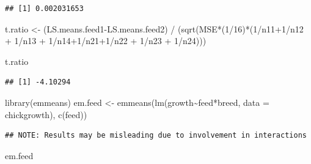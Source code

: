 \documentclass[
]{book}
\newenvironment{Shaded}{\begin{snugshade}}{\end{snugshade}}
\newcommand{\AttributeTok}[1]{\textcolor[rgb]{0.77,0.63,0.00}{#1}}
\newcommand{\DecValTok}[1]{\textcolor[rgb]{0.00,0.00,0.81}{#1}}
\newcommand{\FunctionTok}[1]{\textcolor[rgb]{0.00,0.00,0.00}{#1}}
\newcommand{\NormalTok}[1]{#1}
\newcommand{\OtherTok}[1]{\textcolor[rgb]{0.56,0.35,0.01}{#1}}
\newcommand{\SpecialCharTok}[1]{\textcolor[rgb]{0.00,0.00,0.00}{#1}}
\newcommand{\StringTok}[1]{\textcolor[rgb]{0.31,0.60,0.02}{#1}}
\begin{document}
\begin{verbatim}
## [1] 0.002031653
\end{verbatim}

\begin{Shaded}
\begin{Highlighting}[]
\NormalTok{t.ratio }\OtherTok{\textless{}{-}}\NormalTok{ (LS.means.feed1}\SpecialCharTok{{-}}\NormalTok{LS.means.feed2) }\SpecialCharTok{/}\NormalTok{ (}\FunctionTok{sqrt}\NormalTok{(MSE}\SpecialCharTok{*}\NormalTok{(}\DecValTok{1}\SpecialCharTok{/}\DecValTok{16}\NormalTok{)}\SpecialCharTok{*}\NormalTok{(}\DecValTok{1}\SpecialCharTok{/}\NormalTok{n11}\SpecialCharTok{+}\DecValTok{1}\SpecialCharTok{/}\NormalTok{n12 }\SpecialCharTok{+} \DecValTok{1}\SpecialCharTok{/}\NormalTok{n13 }\SpecialCharTok{+} \DecValTok{1}\SpecialCharTok{/}\NormalTok{n14}\SpecialCharTok{+}\DecValTok{1}\SpecialCharTok{/}\NormalTok{n21}\SpecialCharTok{+}\DecValTok{1}\SpecialCharTok{/}\NormalTok{n22 }\SpecialCharTok{+} \DecValTok{1}\SpecialCharTok{/}\NormalTok{n23 }\SpecialCharTok{+} \DecValTok{1}\SpecialCharTok{/}\NormalTok{n24)))}

\NormalTok{t.ratio}
\end{Highlighting}
\end{Shaded}

\begin{verbatim}
## [1] -4.10294
\end{verbatim}

\begin{Shaded}
\begin{Highlighting}[]
\FunctionTok{library}\NormalTok{(emmeans)}
\NormalTok{em.feed }\OtherTok{\textless{}{-}} \FunctionTok{emmeans}\NormalTok{(}\FunctionTok{lm}\NormalTok{(growth}\SpecialCharTok{\textasciitilde{}}\NormalTok{feed}\SpecialCharTok{*}\NormalTok{breed, }\AttributeTok{data =}\NormalTok{ chickgrowth), }\FunctionTok{c}\NormalTok{(}\StringTok{\textquotesingle{}feed\textquotesingle{}}\NormalTok{))}
\end{Highlighting}
\end{Shaded}

\begin{verbatim}
## NOTE: Results may be misleading due to involvement in interactions
\end{verbatim}

\begin{Shaded}
\begin{Highlighting}[]
\NormalTok{em.feed}
\end{Highlighting}
\end{Shaded}
\end{document}
